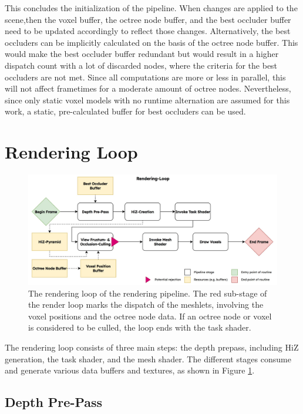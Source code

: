 \noindent
This concludes the initialization of the pipeline. When changes are applied to the scene,then the voxel buffer,
the octree node buffer, and the best occluder buffer need to be updated accordingly to reflect those changes. 
Alternatively, the best occluders can be implicitly calculated on the basis of the octree node buffer. This 
would make the best occluder buffer redundant but would result in a higher dispatch count with a lot of discarded 
nodes, where the criteria for the best occluders are not met. Since all computations are more or less in parallel, 
this will not affect frametimes for a moderate amount of octree nodes. Nevertheless, since only static voxel models 
with no runtime alternation are assumed for this work, a static, pre-calculated buffer for best occluders can be used.


\section{Rendering Loop} \label{sec-rendering-loop}

\begin{figure}[h]
    \centering
    \includegraphics[width=\linewidth]{images/graphics/rendering-loop.jpg}
    \caption{The rendering loop of the rendering pipeline. The red sub-stage of the render loop marks the dispatch 
    of the meshlets, involving the voxel positions and the octree node data. If an octree node or voxel is considered 
    to be culled, the loop ends with the task shader.}
    \label{fig:pipeline-loop}
\end{figure}

\noindent
The rendering loop consists of three main steps: the depth prepass, including \ac{HiZ} generation, the 
task shader, and the mesh shader. The different stages consume and generate various data buffers 
and textures, as shown in Figure \ref{fig:pipeline-loop}. 

\subsection*{Depth Pre-Pass} \label{subsec-depth-prepass}

